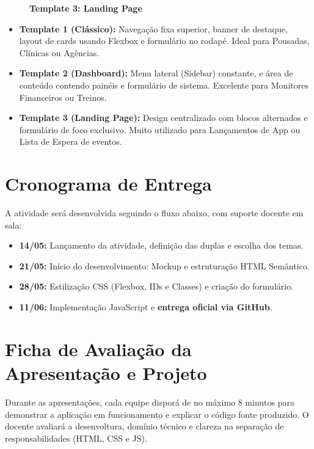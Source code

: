 \documentclass[12pt,a4paper]{article}
\begin{document}
\begin{figure}[H]
\begin{minipage}{0.31\textwidth}
        \vspace{0.2cm}\textbf{Template 3: Landing Page}
    \end{minipage}
\end{figure}

\begin{itemize}
    \item \textbf{Template 1 (Clássico):} Navegação fixa superior, banner de destaque, layout de cards usando Flexbox e formulário no rodapé. Ideal para Pousadas, Clínicas ou Agências.
    \item \textbf{Template 2 (Dashboard):} Menu lateral (Sidebar) constante, e área de conteúdo contendo painéis e formulário de sistema. Excelente para Monitores Financeiros ou Treinos.
    \item \textbf{Template 3 (Landing Page):} Design centralizado com blocos alternados e formulário de foco exclusivo. Muito utilizado para Lançamentos de App ou Lista de Espera de eventos.
\end{itemize}

\vspace{0.5cm}
\section{Cronograma de Entrega}
\begin{boxAtividade}
A atividade será desenvolvida seguindo o fluxo abaixo, com suporte docente em sala:
\begin{itemize}
    \item \textbf{14/05:} Lançamento da atividade, definição das duplas e escolha dos temas.
    \item \textbf{21/05:} Início do desenvolvimento: Mockup e estruturação HTML Semântico.
    \item \textbf{28/05:} Estilização CSS (Flexbox, IDs e Classes) e criação do formulário.
    \item \textbf{11/06:} Implementação JavaScript e \textbf{entrega oficial via GitHub}.
\end{itemize}
\end{boxAtividade}

\newpage
\section{Ficha de Avaliação da Apresentação e Projeto}

\begin{boxAtividade}
Durante as apresentações, cada equipe disporá de no máximo 8 minutos para demonstrar a aplicação em funcionamento e explicar o código fonte produzido. O docente avaliará a desenvoltura, domínio técnico e clareza na separação de responsabilidades (HTML, CSS e JS).
\end{boxAtividade}
\end{document}
